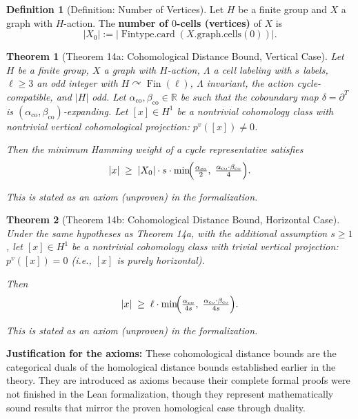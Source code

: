 \documentclass[11pt]{article}
\theoremstyle{plain}
\newtheorem*{theorem}{Theorem}
\theoremstyle{definition}
\newtheorem*{definition}{Definition}
\theoremstyle{remark}
\begin{document}
\begin{definition}[Definition: Number of Vertices]
Let $H$ be a finite group and $X$ a graph with $H$-action. The \textbf{number of $0$-cells (vertices)} of $X$ is
\[
|X_0| := \bigl|\operatorname{Fintype.card}(X\text{.graph.cells}(0))\bigr|.
\]
\end{definition}

\begin{theorem}[Theorem 14a: Cohomological Distance Bound, Vertical Case]
Let $H$ be a finite group, $X$ a graph with $H$-action, $\Lambda$ a cell labeling with $s$ labels, $\ell \geq 3$ an odd integer with $H \curvearrowright \operatorname{Fin}(\ell)$, $\Lambda$ invariant, the action cycle-compatible, and $|H|$ odd. Let $\alpha_{\mathrm{co}}, \beta_{\mathrm{co}} \in \mathbb{R}$ be such that the coboundary map $\delta = \partial^T$ is $(\alpha_{\mathrm{co}}, \beta_{\mathrm{co}})$-expanding. Let $[x] \in H^1$ be a nontrivial cohomology class with nontrivial vertical cohomological projection: $p^v([x]) \neq 0$.

Then the minimum Hamming weight of a cycle representative satisfies
\[
|x| \;\geq\; |X_0| \cdot s \cdot \min\!\Bigl(\tfrac{\alpha_{\mathrm{co}}}{2},\; \tfrac{\alpha_{\mathrm{co}} \cdot \beta_{\mathrm{co}}}{4}\Bigr).
\]

\textit{This is stated as an axiom (unproven) in the formalization.}
\end{theorem}

\begin{theorem}[Theorem 14b: Cohomological Distance Bound, Horizontal Case]
Under the same hypotheses as Theorem 14a, with the additional assumption $s \geq 1$, let $[x] \in H^1$ be a nontrivial cohomology class with \textit{trivial} vertical projection: $p^v([x]) = 0$ (i.e., $[x]$ is purely horizontal).

Then
\[
|x| \;\geq\; \ell \cdot \min\!\Bigl(\tfrac{\alpha_{\mathrm{co}}}{4s},\; \tfrac{\alpha_{\mathrm{co}} \cdot \beta_{\mathrm{co}}}{4s}\Bigr).
\]

\textit{This is stated as an axiom (unproven) in the formalization.}
\end{theorem}

\textbf{Justification for the axioms:} These cohomological distance bounds are the categorical duals of the homological distance bounds established earlier in the theory. They are introduced as axioms because their complete formal proofs were not finished in the Lean formalization, though they represent mathematically sound results that mirror the proven homological case through duality.
\end{document}
